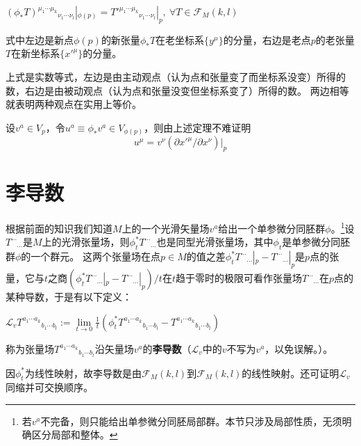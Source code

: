 \begin{theorem}
$(\phi_*T)^{\mu_1 \cdots \mu_k}{}_{\nu_1 \cdots \nu_l}|_{\phi(p)} = T'^{\mu_1 \cdots \mu_k}{}_{\nu_1 \cdots \nu_l}|_p, ~ \forall T \in \mathscr{F}_M(k, l)$

式中左边是新点$\phi(p)$的新张量$\phi_*T$在老坐标系$\{y^\mu\}$的分量，右边是老点$p$的老张量$T$在新坐标系$\{x'^\mu\}$的分量。
\end{theorem}

\begin{note}
上式是实数等式，左边是由主动观点（认为点和张量变了而坐标系没变）所得的数，右边是由被动观点（认为点和张量没变但坐标系变了）所得的数。
两边相等就表明两种观点在实用上等价。
\end{note}

\begin{example}
设$v^a \in V_p$，令$u^a \equiv \phi_*v^a \in V_{\phi(p)}$，则由上述定理不难证明
$$u^\mu = v^\nu(\partial x'^\mu / \partial x^\nu)|_p$$
\end{example}

\section{李导数}

根据前面的知识我们知道$M$上的一个光滑矢量场$v^a$给出一个单参微分同胚群$\phi$。\footnote{
若$v^a$不完备，则只能给出单参微分同胚局部群。本节只涉及局部性质，无须明确区分局部和整体。
}设$T^{\cdots}{}_{\cdots}$是$M$上的光滑张量场，则$\phi^*_tT^{\cdots}{}_{\cdots}$也是同型光滑张量场，其中$\phi_t$是单参微分同胚群$\phi$的一个群元。
这两个张量场在点$p \in M$的值之差$\phi^*_tT^{\cdots}{}_{\cdots}|_p - T^{\cdots}{}_{\cdots}|_p$是$p$点的张量，它与$t$之商$(\phi^*_tT^{\cdots}{}_{\cdots}|_p - T^{\cdots}{}_{\cdots}|_p) / t$在$t$趋于零时的极限可看作张量场$T^{\cdots}{}_{\cdots}$在$p$点的某种导数，于是有以下定义：

\begin{definition}
$\mathscr{L}_vT^{a_1 \cdots a_k}{}_{b_1 \cdots b_l} := \lim\limits_{t \to 0}\frac{1}{t}(\phi^*_tT^{a_1 \cdots a_k}{}_{b_1 \cdots b_l} - T^{a_1 \cdots a_k}{}_{b_1 \cdots b_l})$

称为张量场$T^{a_1 \cdots a_k}{}_{b_1 \cdots b_l}$沿矢量场$v^a$的\textbf{李导数}（$\mathscr{L}_v$中的$v$不写为$v^a$，以免误解。）。
\end{definition}

\begin{note}
因$\phi^*_t$为线性映射，故李导数是由$\mathscr{F}_M(k, l)$到$\mathscr{F}_M(k, l)$的线性映射。还可证明$\mathscr{L}_v$同缩并可交换顺序。
\end{note}

